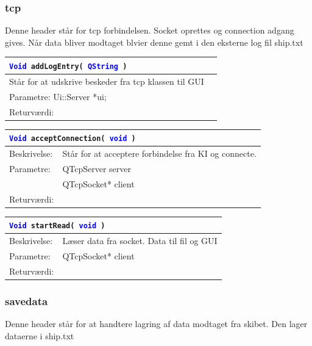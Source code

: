 \subsubsection{tcp}
Denne header står for tcp forbindelsen. Socket oprettes og connection adgang gives. Når data bliver modtaget blvier denne gemt i den eksterne log fil ship.txt

\begin{table}[H]
\begin{tabular}{l p{12.5cm}}
\multicolumn{2}{l}{\texttt{\textcolor{blue}{Void} addLogEntry( \textcolor{blue}{QString} )}} \\
\hline
Står for at udskrive beskeder fra tcp klassen til GUI \\
Parametre: Ui::Server *ui;\\
Returværdi:&\\
\end{tabular}
\end{table}

\begin{table}[H]
\begin{tabular}{l p{12.5cm}}
\multicolumn{2}{l}{\texttt{\textcolor{blue}{Void} acceptConnection( \textcolor{blue}{void} )}} \\
\hline
Beskrivelse:&Står for at acceptere forbindelse fra KI og connecte.\\
Parametre:&QTcpServer server\\
				&QTcpSocket* client\\
Returværdi:&\\
\end{tabular}
\end{table}

\begin{table}[H]
\begin{tabular}{l p{12.5cm}}
\multicolumn{2}{l}{\texttt{\textcolor{blue}{Void} startRead( \textcolor{blue}{void} )}} \\
\hline
Beskrivelse:&Læser data fra socket. Data til fil og GUI\\
Parametre:&QTcpSocket* client\\
Returværdi:&\\
\end{tabular}
\end{table}

\subsubsection{savedata}
Denne header står for at handtere lagring af data modtaget fra skibet. Den lager dataerne i ship.txt

